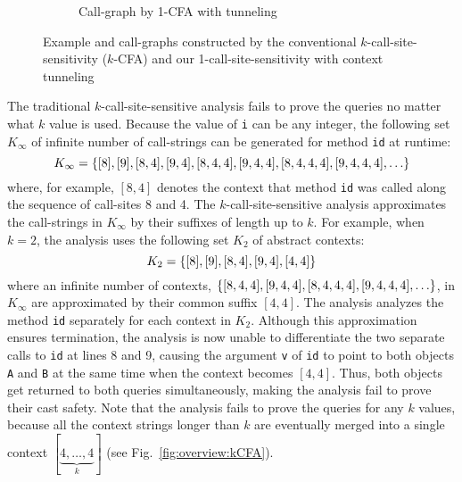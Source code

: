 \begin{figure}
\begin{subfigure}[b]{.45\columnwidth}
\begin{center}
\end{center}
\caption{Call-graph by 1-CFA with tunneling}
\label{fig:overview:tunneling}
\end{subfigure}\qquad
\caption{Example and call-graphs constructed by the conventional
  $k$-call-site-sensitivity ($k$-CFA) and our 1-call-site-sensitivity
  with context tunneling}
\label{fig:overview}
\end{figure}





The traditional $k$-call-site-sensitive analysis fails to prove the queries no matter what $k$ value is used.
Because the value of \texttt{i} can be any integer, the following set $K_{\infty}$ of infinite number of call-strings can be generated for method \texttt{id} at runtime:
\[
K_{\infty} = \myset{[8], [9], [8,4], [9,4], [8,4,4], [9,4,4], [8,4,4,4], [9,4,4,4], \dots}
\]
where, for example, $[8,4]$ denotes the context that method \texttt{id} was called along the sequence of
call-sites 8 and 4.
 The $k$-call-site-sensitive analysis approximates the call-strings in $K_{\infty}$ by their suffixes of length up to $k$. For example, when $k=2$, the analysis uses the following set $K_2$ of abstract contexts:
\[
K_2 = \{ [8], [9], [8,4], [9,4], [4,4] \}
\]
where an infinite number of contexts, $\myset{[8,4,4], [9,4,4], [8,4,4,4], [9,4,4,4],\dots}$, in $K_{\infty}$ are approximated by their common suffix $[4,4]$. The analysis analyzes the method \texttt{id} separately for each context in $K_2$. %
Although this approximation ensures termination, the analysis is now unable to differentiate the two separate calls to \texttt{id} at lines 8 and 9, causing the argument {\tt v} of {\tt id} to point to both objects {\tt A} and {\tt B} at the same time when the context becomes $[4,4]$. Thus, both objects get returned to both queries simultaneously, making the analysis fail to prove their cast safety.
Note that the analysis fails to prove the queries for any $k$ values, because all the context strings longer than $k$ are eventually
merged into a single context $[\underbrace{4,\dots,4}_{k}]$ (see
Fig.~\ref{fig:overview:kCFA}).


